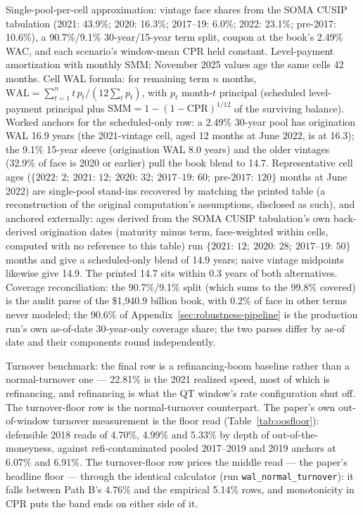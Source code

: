 \documentclass[12pt]{article}
\begin{document}
\begin{table}[H]
\begin{threeparttable}
\begin{tablenotes}[flushleft]
\item Single-pool-per-cell approximation: vintage face shares from the SOMA CUSIP tabulation (2021: 43.9\%; 2020: 16.3\%; 2017--19: 6.0\%; 2022: 23.1\%; pre-2017: 10.6\%), a 90.7\%/9.1\% 30-year/15-year term split, coupon at the book's 2.49\% WAC, and each scenario's window-mean CPR held constant. Level-payment amortization with monthly SMM; November 2025 values age the same cells 42 months. Cell WAL formula: for remaining term $n$ months, $\mathrm{WAL} = \sum_{t=1}^{n} t\, p_t / (12 \sum_{t} p_t)$, with $p_t$ month-$t$ principal (scheduled level-payment principal plus $\mathrm{SMM} = 1-(1-\mathrm{CPR})^{1/12}$ of the surviving balance). Worked anchors for the scheduled-only row: a 2.49\% 30-year pool has origination WAL 16.9 years (the 2021-vintage cell, aged 12 months at June 2022, is at 16.3); the 9.1\% 15-year sleeve (origination WAL 8.0 years) and the older vintages (32.9\% of face is 2020 or earlier) pull the book blend to 14.7. Representative cell ages ($\{2022{:}\,2;\ 2021{:}\,12;\ 2020{:}\,32;\ 2017\text{--}19{:}\,60;\ \text{pre-}2017{:}\,120\}$ months at June 2022) are single-pool stand-ins recovered by matching the printed table (a reconstruction of the original computation's assumptions, disclosed as such), and anchored externally: ages derived from the SOMA CUSIP tabulation's own back-derived origination dates (maturity minus term, face-weighted within cells, computed with no reference to this table) run $\{2021{:}\,12;\ 2020{:}\,28;\ 2017\text{--}19{:}\,50\}$ months and give a scheduled-only blend of 14.9 years; naive vintage midpoints likewise give 14.9. The printed 14.7 sits within 0.3 years of both alternatives. Coverage reconciliation: the 90.7\%/9.1\% split (which sums to the 99.8\% covered) is the audit parse of the \$1{,}940.9 billion book, with 0.2\% of face in other terms never modeled; the 90.6\% of Appendix~\ref{sec:robustness-pipeline} is the production run's own as-of-date 30-year-only coverage share; the two parses differ by as-of date and their components round independently.
\item Turnover benchmark: the final row is a refinancing-boom baseline rather than a normal-turnover one --- 22.81\% is the 2021 realized speed, most of which is refinancing, and refinancing is what the QT window's rate configuration shut off. The turnover-floor row is the normal-turnover counterpart. The paper's own out-of-window turnover measurement is the floor read (Table~\ref{tab:oosfloor}): defensible 2018 reads of 4.70\%, 4.99\% and 5.33\% by depth of out-of-the-moneyness, against refi-contaminated pooled 2017--2019 and 2019 anchors at 6.07\% and 6.91\%. The turnover-floor row prices the middle read --- the paper's headline floor --- through the identical calculator (run \texttt{wal\_normal\_turnover}): it falls between Path B's 4.76\% and the empirical 5.14\% rows, and monotonicity in CPR puts the band ends on either side of it.
\end{tablenotes}
\end{threeparttable}
\end{table}
\end{document}
